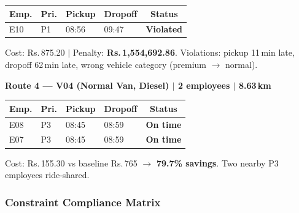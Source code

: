 \documentclass[11pt,a4paper]{article}
\newcommand{\rupee}{Rs.}
\newcommand{\statusok}{\textcolor{velgreen}{\textbf{On time}}}
\newcommand{\statusviol}{\textcolor{velred}{\textbf{Violated}}}
\newcommand{\saving}[1]{\textcolor{velgreen}{\textbf{#1}}}
\begin{document}
\begin{table}[H]
\centering
\begin{tabular}{llllc}
\toprule
\textbf{Emp.} & \textbf{Pri.} & \textbf{Pickup} & \textbf{Dropoff} & \textbf{Status} \\
\midrule
\rowcolor{red!6}
E10 & P1 & 08:56 & 09:47 & \statusviol \\
\bottomrule
\end{tabular}
\end{table}
Cost: \rupee\,875.20\; $|$\; Penalty: \textbf{\rupee\,1,554,692.86}.
Violations: pickup 11\,min late, dropoff 62\,min late, wrong vehicle category (premium $\to$ normal).

\vspace{6pt}
\textbf{Route 4 --- V04 (Normal Van, Diesel) $|$ 2 employees $|$ 8.63\,km}

\begin{table}[H]
\centering
\begin{tabular}{llllc}
\toprule
\textbf{Emp.} & \textbf{Pri.} & \textbf{Pickup} & \textbf{Dropoff} & \textbf{Status} \\
\midrule
\rowcolor{rowalt}
E08 & P3 & 08:45 & 08:59 & \statusok \\
E07 & P3 & 08:45 & 08:59 & \statusok \\
\bottomrule
\end{tabular}
\end{table}
Cost: \rupee\,155.30 vs baseline \rupee\,765 $\rightarrow$ \saving{79.7\% savings}. Two nearby P3 employees ride-shared.

\subsubsection{Constraint Compliance Matrix}
\end{document}
